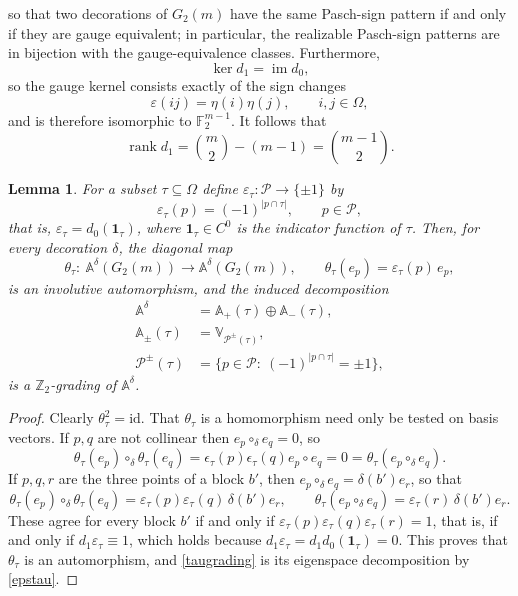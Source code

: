 \documentclass[times,11pt,reqno]{amsproc}
\newtheorem{lemma}[theorem]{Lemma}
\theoremstyle{definition}
\numberwithin{equation}{section}
\def\alg{\mathbb{A}}
\def\valg{\mathbb{V}}
\begin{document}
so that two decorations of $G_2(m)$ have the same Pasch-sign pattern if
and only if they are gauge equivalent; in particular, the realizable
Pasch-sign patterns are in bijection with the gauge-equivalence classes.
Furthermore,
$$
\ker d_1=\operatorname{im}d_0,
$$
so the gauge kernel consists exactly of the sign changes
$$
\varepsilon(ij)=\eta(i)\eta(j),
\qquad
i,j\in\Omega,
$$
and is therefore isomorphic to $\mathbb F_2^{m-1}$. It follows that
\begin{equation}\label{rankd1}
\operatorname{rank}d_1
=
\binom{m}{2}-(m-1)
=
\binom{m-1}{2}.
\end{equation}



\begin{lemma}\label{lem:gradingauto}
For a subset $\tau\subseteq\Omega$ define
$\varepsilon_\tau:\mathcal P\to\{\pm1\}$ by
\begin{equation}\label{epstau}
\varepsilon_\tau(p)=(-1)^{|p\cap\tau|},
\qquad
p\in\mathcal P,
\end{equation}
that is, $\varepsilon_\tau=d_0(\mathbf 1_\tau)$, where
$\mathbf 1_\tau\in C^0$ is the indicator function of $\tau$. Then, for
\emph{every} decoration $\delta$, the diagonal map
\begin{equation}\label{thetatau}
\theta_\tau:\ \alg^\delta(G_2(m))\to\alg^\delta(G_2(m)),
\qquad
\theta_\tau(e_p)=\varepsilon_\tau(p)\,e_p ,
\end{equation}
is an involutive automorphism, and the induced decomposition
\begin{equation}\label{taugrading}
\begin{aligned}
\alg^\delta&=\alg_{+}(\tau)\oplus\alg_{-}(\tau),\\
\alg_{\pm}(\tau)&=\valg_{\mathcal P^{\pm}(\tau)},\\
\mathcal P^{\pm}(\tau)&=\{p\in\mathcal P:\ (-1)^{|p\cap\tau|}=\pm1\},
\end{aligned}
\end{equation}
is a $\mathbb Z_2$-grading of $\alg^\delta$.
\end{lemma}

\begin{proof}
Clearly $\theta_\tau^2=\mathrm{id}$. That $\theta_{\tau}$ is a homomorphism need only be tested
on basis vectors. If $p,q$ are not collinear then
$e_p\circ_\delta e_q=0$, so
$$\theta_\tau(e_p)\circ_\delta\theta_\tau(e_q)
= \epsilon_{\tau}(p)\epsilon_{\tau}(q)e_{p}\circ e_{q} = 0 = \theta_{\tau}(e_{p}\circ_{\delta}e_{q}).$$
If $p,q,r$ are the three points of a block $b'$,
then $e_p\circ_\delta e_q=\delta(b')e_r$, so that
$$
\theta_\tau(e_p)\circ_\delta\theta_\tau(e_q)
=\varepsilon_\tau(p)\varepsilon_\tau(q)\,\delta(b')e_r,
\qquad
\theta_\tau(e_p\circ_\delta e_q)=\varepsilon_\tau(r)\,\delta(b')e_r .
$$
These agree for every block $b'$ if and only if
$\varepsilon_\tau(p)\varepsilon_\tau(q)\varepsilon_\tau(r)=1$, that is,
if and only if $d_1\varepsilon_\tau\equiv1$, which holds because
$d_1\varepsilon_\tau=d_1d_0(\mathbf 1_\tau)=0$. This proves that
$\theta_\tau$ is an automorphism, and \eqref{taugrading} is its
eigenspace decomposition by \eqref{epstau}.
\end{proof}
\end{document}
